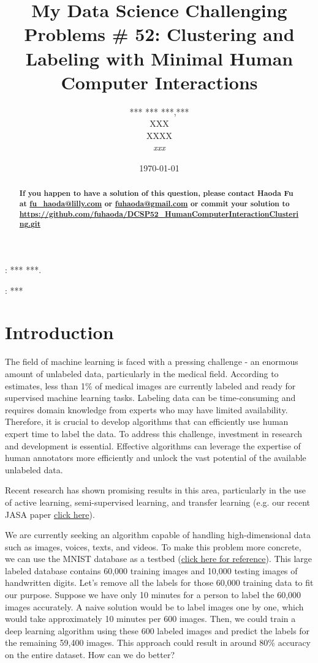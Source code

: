 \documentclass[12pt]{article}
\begin{document}
\title
{\bf My Data Science Challenging Problems \# 52: Clustering and Labeling with Minimal Human Computer Interactions}
\author
{
*** *** ***,***\\
XXX \\
XXXX \\
\textsl{xxx} }
\date{\today}

\maketitle
\begin{abstract}
\textbf{{\color[rgb]{1,0,0} If you happen to have a solution of this question, please contact Haoda Fu at \href{mailto:fu\_haoda@lilly.com }{fu\_haoda@lilly.com} or  \href{mailto:ffuhaoda@gmail.com}{fuhaoda@gmail.com}  or commit your solution to \url{https://github.com/fuhaoda/DCSP52_HumanComputerInteractionClustering.git} }
}

\end{abstract}

: *** ***.

: ***
\section{Introduction}
The field of machine learning is faced with a pressing challenge - an enormous amount of unlabeled data, particularly in the medical field. According to estimates, less than 1\% of medical images are currently labeled and ready for supervised machine learning tasks. Labeling data can be time-consuming and requires domain knowledge from experts who may have limited availability. Therefore, it is crucial to develop algorithms that can efficiently use human expert time to label the data. To address this challenge, investment in research and development is essential. Effective algorithms can leverage the expertise of human annotators more efficiently and unlock the vast potential of the available unlabeled data.

Recent research has shown promising results in this area, particularly in the use of active learning, semi-supervised learning, and transfer learning (e.g. our recent JASA paper \href{https://www.tandfonline.com/doi/abs/10.1080/01621459.2021.2019045}{click here}).

We are currently seeking an algorithm capable of handling high-dimensional data such as images, voices, texts, and videos. To make this problem more concrete, we can use the MNIST database as a testbed (\href{https://en.wikipedia.org/wiki/MNIST_database}{click here for reference}). This large labeled database contains 60,000 training images and 10,000 testing images of handwritten digits. Let's remove all the labels for those 60,000 training data to fit our purpose.  Suppose we have only 10 minutes for a person to label the 60,000 images accurately. A naive solution would be to label images one by one, which would take approximately 10 minutes per 600 images. Then, we could train a deep learning algorithm using these 600 labeled images and predict the labels for the remaining 59,400 images. This approach could result in around 80\% accuracy on the entire dataset. How can we do better?
\end{document}
